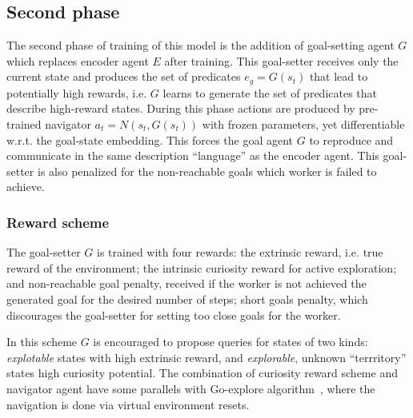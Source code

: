 \documentclass[acmsmall, nonacm]{acmart}
\begin{document}

\subsection{Second phase}

The second phase of training of this model is the addition of goal-setting agent $G$ which replaces encoder agent $E$ after training.
%
This goal-setter receives only the current state and produces the set of predicates $e_g = G(s_t)$ that lead to potentially high rewards, i.e. $G$ learns to generate the set of predicates that describe high-reward states. During this phase actions are produced by pre-trained navigator $a_t = N(s_t, G(s_t))$ with frozen parameters, yet differentiable w.r.t. the goal-state embedding. This forces the goal agent $G$ to reproduce and communicate in the same description ``language'' as the encoder agent. This goal-setter is also penalized for the non-reachable goals which worker is failed to achieve.

\subsubsection{Reward scheme}

The goal-setter $G$ is trained with four rewards: the extrinsic reward, i.e. true reward of the environment; the intrinsic curiosity reward for active exploration; and non-reachable goal penalty, received if the worker is not achieved the generated goal for the desired number of steps; short goals penalty, which discourages the goal-setter for setting too close goals for the worker.

In this scheme $G$ is encouraged to propose queries for states of two kinds: \emph{explotable} states with high extrinsic reward, and \emph{explorable}, unknown ``terrritory'' states high curiosity potential.
%
The combination of curiosity reward scheme and navigator agent have some parallels with Go-explore algorithm~\citep{ecoffet_first_2021}, where the navigation is done via virtual environment resets.
\end{document}

